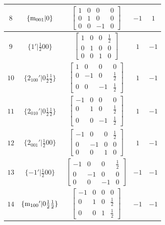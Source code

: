 \documentclass[fleqn,8pt]{jsarticle}
\begin{document}
\begin{longtable}{ccccc}
$ 8 $ & $ \{{\rm m}_{001}|0\} $ & $ \begin{bmatrix} 1 & 0 & 0 & 0 \\ 0 & 1 & 0 & 0 \\ 0 & 0 & -1 & 0 \end{bmatrix} $ & $ -1 $ & $ 1 $ \\ \hline
$ 9 $ & $ \{1{}'|\frac{1}{2} 0 0\} $ & $ \begin{bmatrix} 1 & 0 & 0 & \frac{1}{2} \\ 0 & 1 & 0 & 0 \\ 0 & 0 & 1 & 0 \end{bmatrix} $ & $ 1 $ & $ -1 $ \\ \hline
$ 10 $ & $ \{2{}_{100}{}'|0 \frac{1}{2} \frac{1}{2}\} $ & $ \begin{bmatrix} 1 & 0 & 0 & 0 \\ 0 & -1 & 0 & \frac{1}{2} \\ 0 & 0 & -1 & \frac{1}{2} \end{bmatrix} $ & $ 1 $ & $ -1 $ \\ \hline
$ 11 $ & $ \{2{}_{010}{}'|0 \frac{1}{2} \frac{1}{2}\} $ & $ \begin{bmatrix} -1 & 0 & 0 & 0 \\ 0 & 1 & 0 & \frac{1}{2} \\ 0 & 0 & -1 & \frac{1}{2} \end{bmatrix} $ & $ 1 $ & $ -1 $ \\ \hline
$ 12 $ & $ \{2{}_{001}{}'|\frac{1}{2} 0 0\} $ & $ \begin{bmatrix} -1 & 0 & 0 & \frac{1}{2} \\ 0 & -1 & 0 & 0 \\ 0 & 0 & 1 & 0 \end{bmatrix} $ & $ 1 $ & $ -1 $ \\ \hline
$ 13 $ & $ \{-1{}'|\frac{1}{2} 0 0\} $ & $ \begin{bmatrix} -1 & 0 & 0 & \frac{1}{2} \\ 0 & -1 & 0 & 0 \\ 0 & 0 & -1 & 0 \end{bmatrix} $ & $ -1 $ & $ -1 $ \\ \hline
$ 14 $ & $ \{{\rm m}_{100}{}'|0 \frac{1}{2} \frac{1}{2}\} $ & $ \begin{bmatrix} -1 & 0 & 0 & 0 \\ 0 & 1 & 0 & \frac{1}{2} \\ 0 & 0 & 1 & \frac{1}{2} \end{bmatrix} $ & $ -1 $ & $ -1 $ \\ \hline

\end{longtable}
\end{document}
